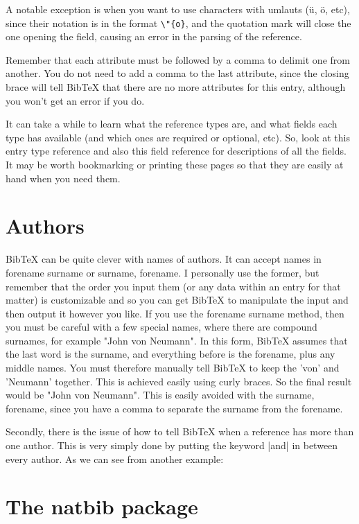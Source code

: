 \begin{refsection}
A notable exception is when you want to use characters with umlauts (ü, ö, etc), since their notation is in the format \verb+\"{o}+, and the quotation mark will close the one opening the field, causing an error in the parsing of the reference.

Remember that each attribute must be followed by a comma to delimit one from another. You do not need to add a comma to the last attribute, since the closing brace will tell BibTeX that there are no more attributes for this entry, although you won't get an error if you do.

It can take a while to learn what the reference types are, and what fields each type has available (and which ones are required or optional, etc). So, look at this entry type reference and also this field reference for descriptions of all the fields. It may be worth bookmarking or printing these pages so that they are easily at hand when you need them.

\section{Authors}

BibTeX can be quite clever with names of authors. It can accept names in forename surname or surname, forename. I personally use the former, but remember that the order you input them (or any data within an entry for that matter) is customizable and so you can get BibTeX to manipulate the input and then output it however you like. If you use the forename surname method, then you must be careful with a few special names, where there are compound surnames, for example "John von Neumann". In this form, BibTeX assumes that the last word is the surname, and everything before is the forename, plus any middle names. You must therefore manually tell BibTeX to keep the 'von' and 'Neumann' together. This is achieved easily using curly braces. So the final result would be "John {von Neumann}". This is easily avoided with the surname, forename, since you have a comma to separate the surname from the forename.

Secondly, there is the issue of how to tell BibTeX when a reference has more than one author. This is very simply done by putting the keyword |and| in between every author. As we can see from another example:


\section{The natbib package}


\end{refsection}
